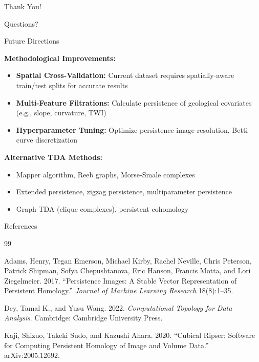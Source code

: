 \documentclass{beamer}
\begin{document}
\begin{frame}{Thank You!}

\centering
\Huge Questions?

\end{frame}

\appendix

\begin{frame}{Future Directions}

\textbf{Methodological Improvements:}
\begin{itemize}
    \item \textbf{Spatial Cross-Validation:} Current dataset requires spatially-aware train/test splits for accurate results
    \item \textbf{Multi-Feature Filtrations:} Calculate persistence of geological covariates (e.g., slope, curvature, TWI)
    \item \textbf{Hyperparameter Tuning:} Optimize persistence image resolution, Betti curve discretization
\end{itemize}

\textbf{Alternative TDA Methods:}
\begin{itemize}
    \item Mapper algorithm, Reeb graphs, Morse-Smale complexes
    \item Extended persistence, zigzag persistence, multiparameter persistence
    \item Graph TDA (clique complexes), persistent cohomology
\end{itemize}

\end{frame}

\begin{frame}{References}
\begin{thebibliography}{99}

Adams, Henry, Tegan Emerson, Michael Kirby, Rachel Neville, Chris Peterson, Patrick Shipman, Sofya Chepushtanova, Eric Hanson, Francis Motta, and Lori Ziegelmeier. 2017. ``Persistence Images: A Stable Vector Representation of Persistent Homology.'' \textit{Journal of Machine Learning Research} 18(8):1--35.

Dey, Tamal K., and Yusu Wang. 2022. \textit{Computational Topology for Data Analysis}. Cambridge: Cambridge University Press.

Kaji, Shizuo, Takeki Sudo, and Kazushi Ahara. 2020. ``Cubical Ripser: Software for Computing Persistent Homology of Image and Volume Data.'' arXiv:2005.12692.

\end{thebibliography}
\end{frame}
\end{document}

